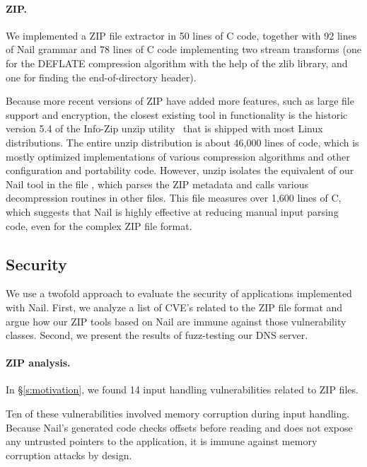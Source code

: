 \paragraph{ZIP.}

We implemented a ZIP file extractor in 50 lines of C code, together with
92 lines of Nail grammar and 78 lines of C code implementing two stream
transforms (one for the DEFLATE compression algorithm with the help of
the zlib library, and one for finding the end-of-directory header).

Because more recent versions of ZIP have added more features, such
as large file support and encryption, the closest existing tool
in functionality is the historic version 5.4 of the Info-Zip unzip
utility~\cite{infozip} that is shipped with most Linux distributions.
The entire unzip distribution is about 46,000 lines of code, which is
mostly optimized implementations of various compression algorithms and
other configuration and portability code.  However, unzip isolates the
equivalent of our Nail tool in the file , which parses the
ZIP metadata and calls various decompression routines in other files. This
file measures over 1,600 lines of C, which suggests that Nail is highly
effective at reducing manual input parsing code, even for the complex
ZIP file format.

\subsection{Security} 

We use a twofold approach to evaluate the security of applications
implemented with Nail. First, we analyze a list of CVE's related to the
ZIP file format and argue how our ZIP tools based on Nail are immune
against those vulnerability classes. Second, we present the results of
fuzz-testing our DNS server.

\paragraph{ZIP analysis.}

In \S\ref{s:motivation}, we found 14 input handling vulnerabilities related to ZIP files.

Ten of these vulnerabilities involved memory corruption during input handling.
Because Nail's generated code checks offsets before reading and does not
expose any untrusted pointers to the application, it is immune against
memory corruption attacks by design.

